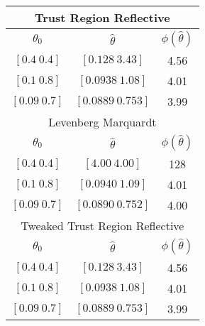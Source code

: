 \begin{tabular}{ccc} \hline \hline 
\multicolumn{3}{c}{Trust Region Reflective} \\ \hline
$\theta_0$ 		& $\hat{\theta}$ 	& $\phi(\hat{\theta})$ \\ \hline
$[0.4\ 0.4]$ 	& $[0.128\ 3.43]$ 	& 4.56 \\
$[0.1\ 0.8]$  		& $[0.0938\ 1.08]$ 	& 4.01 \\ 
$[0.09\ 0.7]$	& $[0.0889\ 0.753]$ 	& 3.99 \\ \hline \hline
\multicolumn{3}{c}{Levenberg Marquardt} \\ \hline
$\theta_0$ 		& $\hat{\theta}$ 	& $\phi(\hat{\theta})$ \\ \hline
$[0.4\ 0.4]$		& $[4.00\ 4.00]$		& 128 \\ 
$[0.1\ 0.8]$		& $[0.0940\ 1.09]$	& 4.01 \\
$[0.09\ 0.7]$	& $[0.0890\ 0.752]$	& 4.00 \\ \hline \hline
\multicolumn{3}{c}{Tweaked Trust Region Reflective} \\ \hline
$\theta_0$ 		& $\hat{\theta}$ 	& $\phi(\hat{\theta})$ \\ \hline
$[0.4\ 0.4]$		& $[0.128\ 3.43]$	& 4.56	 \\ 
$[0.1\ 0.8]$  		& $[0.0938\ 1.08]$ 	& 4.01 \\ 
$[0.09\ 0.7]$	& $[0.0889\ 0.753]$ 	& 3.99 \\ \hline \hline
\end{tabular}